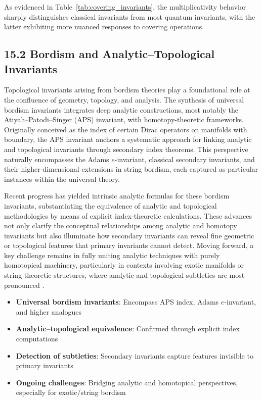 \documentclass[11pt]{article}
\begin{document}
As evidenced in Table~\ref{tab:covering_invariants}, the multiplicativity behavior sharply distinguishes classical invariants from most quantum invariants, with the latter exhibiting more nuanced responses to covering operations.

\subsection{15.2 Bordism and Analytic–Topological Invariants}

Topological invariants arising from bordism theories play a foundational role at the confluence of geometry, topology, and analysis. The synthesis of universal bordism invariants integrates deep analytic constructions, most notably the Atiyah–Patodi–Singer (APS) invariant, with homotopy-theoretic frameworks. Originally conceived as the index of certain Dirac operators on manifolds with boundary, the APS invariant anchors a systematic approach for linking analytic and topological invariants through secondary index theorems. This perspective naturally encompasses the Adams $e$-invariant, classical secondary invariants, and their higher-dimensional extensions in string bordism, each captured as particular instances within the universal theory.

Recent progress has yielded intrinsic analytic formulas for these bordism invariants, substantiating the equivalence of analytic and topological methodologies by means of explicit index-theoretic calculations. These advances not only clarify the conceptual relationships among analytic and homotopy invariants but also illuminate how secondary invariants can reveal fine geometric or topological features that primary invariants cannot detect. Moving forward, a key challenge remains in fully uniting analytic techniques with purely homotopical machinery, particularly in contexts involving exotic manifolds or string-theoretic structures, where analytic and topological subtleties are most pronounced \cite{ref82}.

\begin{itemize}
    \item \textbf{Universal bordism invariants}: Encompass APS index, Adams $e$-invariant, and higher analogues
    \item \textbf{Analytic–topological equivalence}: Confirmed through explicit index computations
    \item \textbf{Detection of subtleties}: Secondary invariants capture features invisible to primary invariants
    \item \textbf{Ongoing challenges}: Bridging analytic and homotopical perspectives, especially for exotic/string bordism
\end{itemize}
\end{document}
